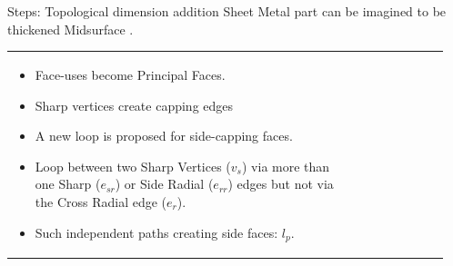 \begin{frame}{Steps: Topological dimension addition}
Sheet Metal part can be imagined to be thickened Midsurface \cite{SHLee2001}.
\begin{tabular}[htp]{@{}p{0.75\linewidth} p{0.2\linewidth}@{}} 

	\begin{itemize}[noitemsep,label=\textbullet,topsep=2pt,parsep=2pt,partopsep=2pt]
	\item Face-uses become Principal Faces. 
 
\item Sharp vertices create capping edges

\item A new loop is proposed for side-capping faces. 
\item Loop between two Sharp Vertices ($v_s$) via more than one Sharp  ($e_{sr}$) or Side Radial ($e_{rr}$) edges but not via the Cross Radial edge ($e_r$). 
\item Such independent paths creating side faces: $l_p$.


\end{itemize}
\end{tabular}
\end{frame}
